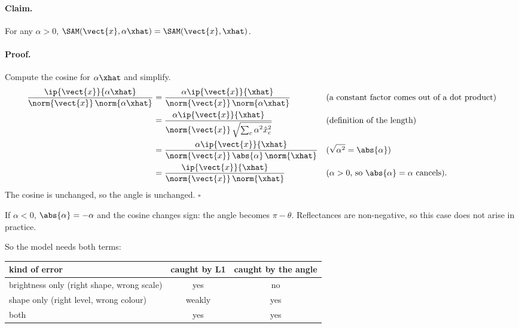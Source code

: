 \paragraph{Claim.} For any $\alpha > 0$, $\SAM(\vect{x}, \alpha\xhat) = \SAM(\vect{x}, \xhat)$.

\paragraph{Proof.} Compute the cosine for $\alpha\xhat$ and simplify.
\begin{align*}
\frac{\ip{\vect{x}}{\alpha\xhat}}{\norm{\vect{x}}\,\norm{\alpha\xhat}}
&= \frac{\alpha\ip{\vect{x}}{\xhat}}{\norm{\vect{x}}\,\norm{\alpha\xhat}}
  && \text{(a constant factor comes out of a dot product)}\\
&= \frac{\alpha\ip{\vect{x}}{\xhat}}{\norm{\vect{x}}\,\sqrt{\textstyle\sum_c \alpha^2\hat{x}_c^2}}
  && \text{(definition of the length)}\\
&= \frac{\alpha\ip{\vect{x}}{\xhat}}{\norm{\vect{x}}\,\abs{\alpha}\,\norm{\xhat}}
  && \text{($\sqrt{\alpha^2} = \abs{\alpha}$)}\\
&= \frac{\ip{\vect{x}}{\xhat}}{\norm{\vect{x}}\,\norm{\xhat}}
  && \text{($\alpha > 0$, so $\abs{\alpha} = \alpha$ cancels).}
\end{align*}
The cosine is unchanged, so the angle is unchanged. $\square$

If $\alpha < 0$, $\abs{\alpha} = -\alpha$ and the cosine changes sign: the angle becomes
$\pi - \theta$. Reflectances are non-negative, so this case does not arise in practice.


So the model needs both terms:
\begin{center}
\begin{tabular}{lcc}
\toprule
kind of error & caught by L1 & caught by the angle\\
\midrule
brightness only (right shape, wrong scale) & yes & no\\
shape only (right level, wrong colour) & weakly & yes\\
both & yes & yes\\
\bottomrule
\end{tabular}
\end{center}

